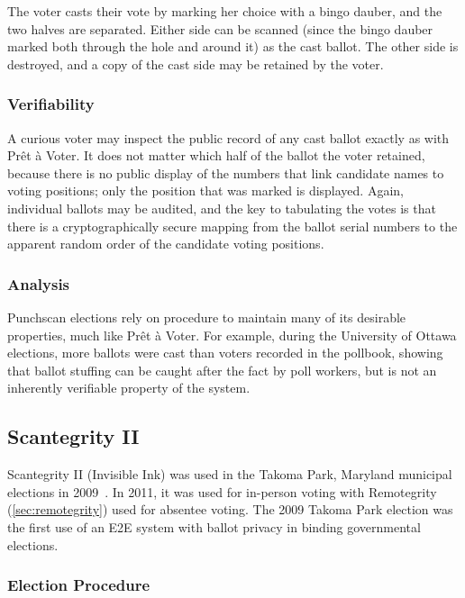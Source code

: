 The voter casts their vote by marking her choice with a bingo dauber,
and the two halves are separated. Either side can be scanned (since
the bingo dauber marked both through the hole and around it) as the
cast ballot. The other side is destroyed, and a copy of the cast side
may be retained by the voter.

\subsubsection{Verifiability}

A curious voter may inspect the public record of any cast ballot
exactly as with Prêt à Voter. It does not matter which half of the
ballot the voter retained, because there is no public display of the
numbers that link candidate names to voting positions; only the
position that was marked is displayed. Again, individual ballots may
be audited, and the key to tabulating the votes is that there is a
cryptographically secure mapping from the ballot serial numbers to the
apparent random order of the candidate voting positions.

\subsubsection{Analysis}

Punchscan elections rely on procedure to maintain many of its
desirable properties, much like Prêt à Voter. For example, during the
University of Ottawa elections, more ballots were cast than voters
recorded in the pollbook, showing that ballot stuffing can be caught
after the fact by poll workers, but is not an inherently verifiable
property of the system.


\subsection{Scantegrity II~\cite{chaum2008,chaum2009}}
\label{sec:scantegrity-ii}

Scantegrity II (Invisible Ink) was used in the Takoma Park, Maryland
municipal elections in 2009~\cite{carback2010}. In 2011, it was used
for in-person voting with Remotegrity (\ref{sec:remotegrity}) used for
absentee voting. The 2009 Takoma Park election was the first use of an
E2E system with ballot privacy in binding governmental elections.

\subsubsection{Election Procedure}

